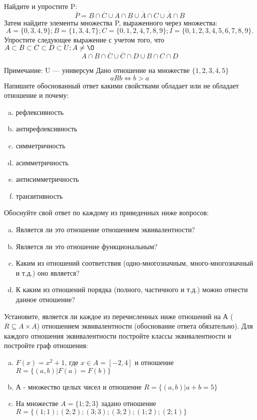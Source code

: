 \documentclass[10pt]{exam}
\begin{document}
\begin{questions}
\question
Найдите и упростите P:
\begin{equation*}
\overline{P} = B \cap \overline{C} \cup A \cap B \cup \overline{A} \cap C \cup \overline{A} \cap B
\end{equation*}
Затем найдите элементы множества P, выраженного через множества:
\begin{equation*}
A = \{0, 3, 4, 9\}; 
B = \{1, 3, 4, 7\};
C = \{0, 1, 2, 4, 7, 8, 9\};
I = \{0, 1, 2, 3, 4, 5, 6, 7, 8, 9\}.
\end{equation*}\question
Упростите следующее выражение с учетом того, что $A\subset B \subset C \subset D \subset U; A \neq \O$
\begin{equation*}
A \cap B  \cap \overline{C} \cup \overline{C} \cap D \cup B \cap C \cap D
\end{equation*}

Примечание: U — универсум\question
Дано отношение на множестве $\{1, 2, 3, 4, 5\}$ 
\begin{equation*}
aRb \iff b > a
\end{equation*}
Напишите обоснованный ответ какими свойствами обладает или не обладает отношение и почему:   
\begin{enumerate} [a)]\setcounter{enumi}{0}
\item рефлексивность
\item антирефлексивность
\item симметричность
\item асимметричность
\item антисимметричность
\item транзитивность
\end{enumerate}

Обоснуйте свой ответ по каждому из приведенных ниже вопросов:
\begin{enumerate} [a)]\setcounter{enumi}{0}
    \item Является ли это отношение отношением эквивалентности?
    \item Является ли это отношение функциональным?
    \item Каким из отношений соответствия (одно-многозначным, много-многозначный и т.д.) оно является?
    \item К каким из отношений порядка (полного, частичного и т.д.) можно отнести данное отношение?
\end{enumerate}

\question
Установите, является ли каждое из перечисленных ниже отношений на А ($R \subseteq A \times A$) отношением эквивалентности (обоснование ответа обязательно). Для каждого отношения эквивалентности постройте классы эквивалентности и постройте граф отношения:
\begin{enumerate} [a)]\setcounter{enumi}{0}
\item $F(x)=x^{2}+1$, где $x \in A = [-2, 4]$ и отношение $R = \{(a,b)|F(a) = F(b)\}$
\item А - множество целых чисел и отношение $R = \{(a,b)|a + b = 5\}$
\item На множестве $A = \{1; 2; 3\}$ задано отношение $R = \{(1; 1); (2; 2); (3; 3); (3; 2); (1; 2); (2; 1)\}$


\end{enumerate}
\end{questions}
\end{document}
